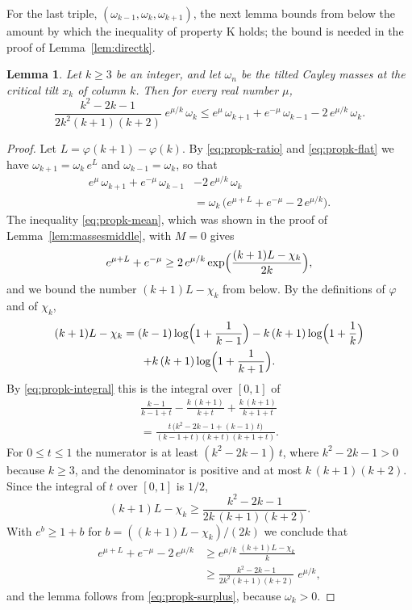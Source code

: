 \documentclass{amsart}
\newtheorem{lemma}[theorem]{Lemma}
\theoremstyle{definition}
\theoremstyle{remark}
\numberwithin{equation}{section}
\begin{document}
For the last triple, $(\omega_{k-1},\omega_k,\omega_{k+1})$, the next lemma
bounds from below the amount by which the inequality of property K holds;
the bound is needed in the proof of
Lemma~\ref{lem:directk}.

\begin{lemma}\label{lem:topsurplus}
Let $k\ge3$ be an integer, and let $\omega_n$ be the tilted Cayley masses
at the critical tilt $x_k$ of column $k$. Then for every real number $\mu$,
\[
\frac{k^2-2k-1}{2k^2(k+1)(k+2)}\;e^{\mu/k}\,\omega_k
\le e^{\mu}\,\omega_{k+1}+e^{-\mu}\,\omega_{k-1}-2\,e^{\mu/k}\,\omega_k .
\]
\end{lemma}

\begin{proof}
Let $L=\varphi(k+1)-\varphi(k)$. By \eqref{eq:propk-ratio} and
\eqref{eq:propk-flat} we have $\omega_{k+1}=\omega_k\,e^{L}$ and
$\omega_{k-1}=\omega_k$, so that
\begin{equation}\label{eq:propk-surplus}
\begin{split}
e^{\mu}\,\omega_{k+1}+e^{-\mu}\,\omega_{k-1}&-2\,e^{\mu/k}\,\omega_k\\
&=\omega_k\,\bigl(e^{\mu+L}+e^{-\mu}-2\,e^{\mu/k}\bigr).
\end{split}
\end{equation}
The inequality \eqref{eq:propk-mean}, which was shown in the proof of
Lemma~\ref{lem:massesmiddle}, with $M=0$ gives
\[
e^{\mu+L}+e^{-\mu}\ge
2\,e^{\mu/k}\exp\Bigl(\frac{(k+1)L-\chi_k}{2k}\Bigr),
\]
and we bound the number $(k+1)L-\chi_k$ from below. By the definitions of
$\varphi$ and of $\chi_k$,
\begin{multline*}
(k+1)L-\chi_k=(k-1)\log\Bigl(1+\frac1{k-1}\Bigr)
-k\,(k+1)\log\Bigl(1+\frac1k\Bigr)\\
+k\,(k+1)\log\Bigl(1+\frac1{k+1}\Bigr).
\end{multline*}
By \eqref{eq:propk-integral} this is the integral over $[0,1]$ of
\begin{multline*}
\frac{k-1}{k-1+t}-\frac{k\,(k+1)}{k+t}+\frac{k\,(k+1)}{k+1+t}\\
=\frac{t\,\bigl(k^2-2k-1+(k-1)\,t\bigr)}{(k-1+t)(k+t)(k+1+t)} .
\end{multline*}
For $0\le t\le1$ the numerator is at least $(k^2-2k-1)\,t$, where
$k^2-2k-1>0$ because $k\ge3$, and the denominator is positive and at most
$k\,(k+1)(k+2)$. Since the integral of $t$ over $[0,1]$ is $1/2$,
\[
(k+1)L-\chi_k\ge\frac{k^2-2k-1}{2k\,(k+1)(k+2)} .
\]
With $e^{b}\ge1+b$ for $b=((k+1)L-\chi_k)/(2k)$ we conclude that
\begin{align*}
e^{\mu+L}+e^{-\mu}-2\,e^{\mu/k}
&\ge e^{\mu/k}\,\frac{(k+1)L-\chi_k}{k}\\
&\ge\frac{k^2-2k-1}{2k^2(k+1)(k+2)}\;e^{\mu/k} ,
\end{align*}
and the lemma follows from \eqref{eq:propk-surplus}, because $\omega_k>0$.
\end{proof}
\end{document}
